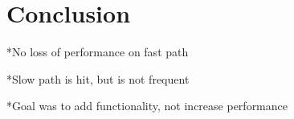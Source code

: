 \section{Conclusion}\label{Conclusion}

*No loss of performance on fast path

*Slow path is hit, but is not frequent

*Goal was to add functionality, not increase performance